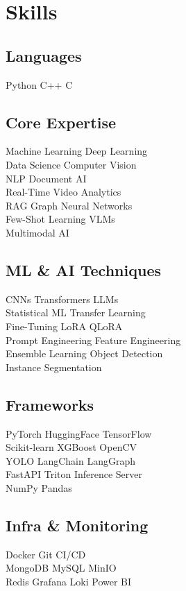 \documentclass[]{deedy-resume-openfont}
\begin{document}
\begin{minipage}[t]{0.33\textwidth}
\section{Skills}
\subsection{Languages}
Python \textbullet{} C++ \textbullet{} C
\sectionsep

\subsection{Core Expertise}
Machine Learning \textbullet{} Deep Learning \\
Data Science \textbullet{} Computer Vision \\
NLP \textbullet{} Document AI \\
Real-Time Video Analytics \\
RAG \textbullet{} Graph Neural Networks \\
Few-Shot Learning \textbullet{} VLMs \\
Multimodal AI
\sectionsep

\subsection{ML \& AI Techniques}
CNNs \textbullet{} Transformers \textbullet{} LLMs \\
Statistical ML \textbullet{} Transfer Learning \\
Fine-Tuning \textbullet{} LoRA \textbullet{} QLoRA \\
Prompt Engineering \textbullet{} Feature Engineering \\
Ensemble Learning \textbullet{} Object Detection \\
Instance Segmentation
\sectionsep

\subsection{Frameworks}
PyTorch \textbullet{} HuggingFace \textbullet{} TensorFlow \\
Scikit-learn \textbullet{} XGBoost \textbullet{} OpenCV \\
YOLO \textbullet{} LangChain \textbullet{} LangGraph \\
FastAPI \textbullet{} Triton Inference Server \\
NumPy \textbullet{} Pandas
\sectionsep

\subsection{Infra \& Monitoring}
Docker \textbullet{} Git \textbullet{} CI/CD \\
MongoDB \textbullet{} MySQL \textbullet{} MinIO \\
Redis \textbullet{} Grafana \textbullet{} Loki \textbullet{} Power BI
\sectionsep


\end{minipage}
\end{document}
